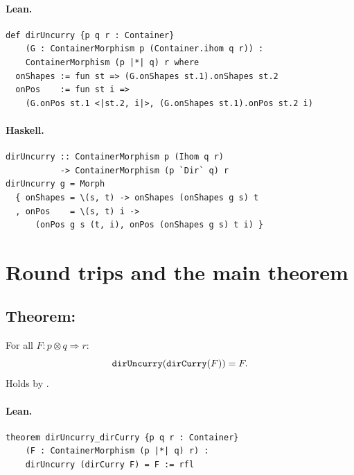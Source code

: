 \documentclass[11pt,a4paper]{article}
\begin{document}
\paragraph{Lean.}
\begin{lstlisting}[style=lean]
def dirUncurry {p q r : Container}
    (G : ContainerMorphism p (Container.ihom q r)) :
    ContainerMorphism (p |*| q) r where
  onShapes := fun st => (G.onShapes st.1).onShapes st.2
  onPos    := fun st i =>
    (G.onPos st.1 <|st.2, i|>, (G.onShapes st.1).onPos st.2 i)
\end{lstlisting}

\paragraph{Haskell.}
\begin{lstlisting}[style=haskell]
dirUncurry :: ContainerMorphism p (Ihom q r)
           -> ContainerMorphism (p `Dir` q) r
dirUncurry g = Morph
  { onShapes = \(s, t) -> onShapes (onShapes g s) t
  , onPos    = \(s, t) i ->
      (onPos g s (t, i), onPos (onShapes g s) t i) }
\end{lstlisting}


\section{Round trips and the main theorem}

\subsection{Theorem: }

\begin{thm}
For all $F : p \otimes q \Rightarrow r$:
\[
  \texttt{dirUncurry}(\texttt{dirCurry}(F)) = F.
\]
Holds by .
\end{thm}

\paragraph{Lean.}
\begin{lstlisting}[style=lean]
theorem dirUncurry_dirCurry {p q r : Container}
    (F : ContainerMorphism (p |*| q) r) :
    dirUncurry (dirCurry F) = F := rfl
\end{lstlisting}
\end{document}
